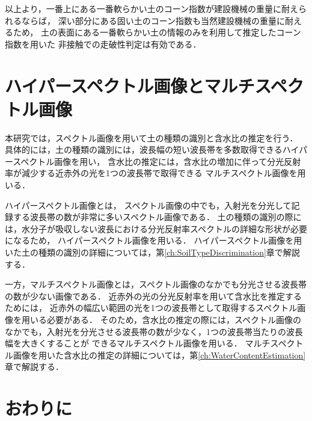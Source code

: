
以上より，一番上にある一番軟らかい土のコーン指数が建設機械の重量に耐えられるならば，
深い部分にある固い土のコーン指数も当然建設機械の重量に耐えるため，
土の表面にある一番軟らかい土の情報のみを利用して推定したコーン指数を用いた
非接触での走破性判定は有効である．

\clearpage

\section{ハイパースペクトル画像とマルチスペクトル画像}
\label{sec:HyperAndMultiImages}

本研究では，スペクトル画像を用いて土の種類の識別と含水比の推定を行う．
具体的には，土の種類の識別には，波長幅の短い波長帯を多数取得できるハイパースペクトル画像を用い，
含水比の推定には，含水比の増加に伴って分光反射率が減少する近赤外の光を1つの波長帯で取得できる
マルチスペクトル画像を用いる．

ハイパースペクトル画像とは，
スペクトル画像の中でも，入射光を分光して記録する波長帯の数が非常に多いスペクトル画像である\cite{横矢2014}．
土の種類の識別の際には，水分子が吸収しない波長における分光反射率スペクトルの詳細な形状が必要になるため，
ハイパースペクトル画像を用いる．
ハイパースペクトル画像を用いた土の種類の識別の詳細については，第\ref{ch:SoilTypeDiscrimination}章で解説する．

一方，マルチスペクトル画像とは，スペクトル画像のなかでも分光させる波長帯の数が少ない画像である．
近赤外の光の分光反射率を用いて含水比を推定するためには，
近赤外の幅広い範囲の光を1つの波長帯として取得するスペクトル画像を用いる必要がある．
そのため，含水比の推定の際には，スペクトル画像のなかでも，入射光を分光させる波長帯の数が少なく，1つの波長帯当たりの波長幅を大きくすることが
できるマルチスペクトル画像を用いる．
マルチスペクトル画像を用いた含水比の推定の詳細については，第\ref{ch:WaterContentEstimation}章で解説する．

\clearpage

\section{おわりに}

